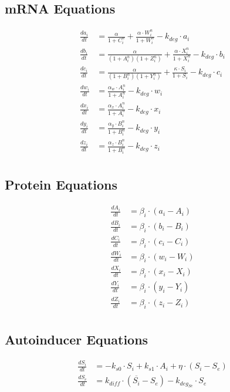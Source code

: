\documentclass[fleqn]{article}
\begin{document}
\subsection*{mRNA Equations}
\begin{align*}
\frac{da_i}{dt} &= \frac{\alpha}{1 + C_i^n} +  \frac{\alpha \cdot W_i^n}{1 + W_i^n} - k_{deg} \cdot a_i \\
\frac{db_i}{dt} &= \frac{\alpha}{(1 + A_i^n)(1 + Z_i^n)} + \frac{\alpha \cdot X_i^n}{1 + X_i^n} - k_{deg} \cdot b_i \\
\frac{dc_i}{dt} &= \frac{\alpha}{(1 + B_i^n)(1 + Y_i^n)} + \frac{\kappa \cdot S_i}{1 + S_i} - k_{deg} \cdot c_i \\
\frac{dw_i}{dt} &= \frac{\alpha_w \cdot A_i^n}{1 + A_i^n} - k_{deg} \cdot w_i \\
\frac{dx_i}{dt} &= \frac{\alpha_x \cdot A_i^n}{1 + A_i^n} - k_{deg} \cdot x_i \\
\frac{dy_i}{dt} &= \frac{\alpha_y \cdot B_i^n}{1 + B_i^n} - k_{deg} \cdot y_i \\
\frac{dz_i}{dt} &= \frac{\alpha_z \cdot B_i^n}{1 + B_i^n} - k_{deg} \cdot z_i \\
\end{align*}

\subsection*{Protein Equations}
\begin{align*}
\frac{dA_i}{dt} &= \beta_i \cdot (a_i - A_i) \\
\frac{dB_i}{dt} &= \beta_i \cdot (b_i - B_i) \\
\frac{dC_i}{dt} &= \beta_i \cdot (c_i - C_i) \\
\frac{dW_i}{dt} &= \beta_i \cdot (w_i - W_i) \\
\frac{dX_i}{dt} &= \beta_i \cdot (x_i - X_i) \\
\frac{dY_i}{dt} &= \beta_i \cdot (y_i - Y_i) \\
\frac{dZ_i}{dt} &= \beta_i \cdot (z_i - Z_i) \\
\end{align*}

\subsection*{Autoinducer Equations}
\begin{align*}
\frac{dS_i}{dt} &= -k_{s0} \cdot S_i + k_{s1} \cdot A_i + \eta \cdot (S_i - S_e) \\
\frac{dS_e}{dt} &= k_{diff} \cdot (\overline{S_i} - S_e) - k_{deg_{Se}} \cdot S_e \\
\end{align*}
\end{document}
